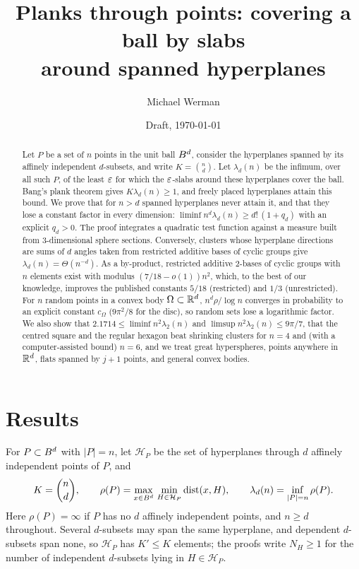 \documentclass[11pt]{article}
\title{Planks through points: covering a ball by slabs\\ around spanned hyperplanes}
\author{Michael Werman}
\date{Draft, \today}
\begin{document}
\maketitle

\begin{abstract}
Let $P$ be a set of $n$ points in the unit ball $B^d$, consider the hyperplanes spanned by its
affinely independent $d$-subsets, and write $K=\binom nd$. Let $\lambda_d(n)$ be the infimum, over all such
$P$, of the least $\varepsilon$ for which the $\varepsilon$-slabs around these hyperplanes cover the ball. Bang's plank
theorem gives $K\lambda_d(n)\ge1$, and freely placed hyperplanes attain this bound. We prove that for
$n>d$ spanned hyperplanes never attain it, and that they lose a constant factor in every dimension:
$\liminf n^d\lambda_d(n)\ge d!\,(1+q_d)$ with an explicit $q_d>0$. The proof integrates a quadratic test
function against a measure built from $3$-dimensional sphere sections. Conversely, clusters whose
hyperplane directions are sums of $d$ angles taken from restricted additive bases of cyclic groups give
$\lambda_d(n)=\Theta(n^{-d})$. As a by-product, restricted additive $2$-bases of cyclic groups with $n$
elements exist with modulus $(7/18-o(1))n^2$, which, to the best of our knowledge, improves the published
constants $5/18$ (restricted) and $1/3$ (unrestricted). For $n$ random points in a convex body $\Omega\subset\mathbb{R}^d$,
$n^d\rho/\log n$ converges in probability to an explicit constant $c_\Omega$ ($9\pi^2/8$ for the disc), so random sets lose
a logarithmic factor.
We also show that $2.1714\le\liminf n^2\lambda_2(n)$ and $\limsup n^2\lambda_2(n)\le9\pi/7$, that the centred square and the regular hexagon beat shrinking clusters
for $n=4$ and (with a computer-assisted bound) $n=6$, and we treat great hyperspheres, points anywhere in $\mathbb{R}^d$, flats spanned by $j+1$
points, and general convex bodies.
\end{abstract}

\section{Results}\label{sec:results}

For $P\subset B^d$ with $|P|=n$, let $\mathcal H_P$ be the set of hyperplanes through $d$ affinely
independent points of $P$, and
\[
K=\binom nd,\qquad \rho(P)=\max_{x\in B^d}\,\min_{H\in\mathcal H_P}\operatorname{dist}(x,H),\qquad
\lambda_d(n)=\inf_{|P|=n}\rho(P).
\]
Here $\rho(P)=\infty$ if $P$ has no $d$ affinely independent points, and $n\ge d$ throughout. Several
$d$-subsets may span the same hyperplane, and dependent $d$-subsets span none, so $\mathcal H_P$ has
$K'\le K$ elements; the proofs write $N_H\ge1$ for the number of independent $d$-subsets lying in
$H\in\mathcal H_P$.
\end{document}
